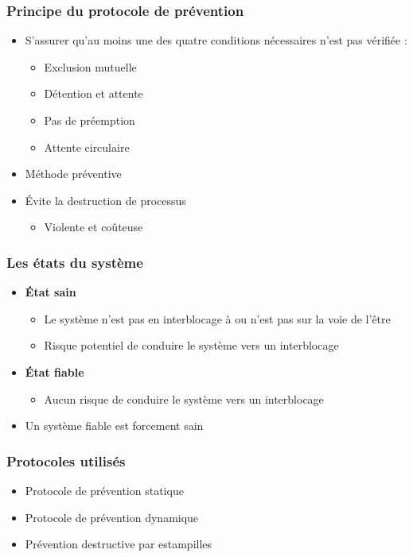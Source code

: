 \begin{frame}
\frametitle{Principe du protocole de prévention}
\begin{itemize}
\item S’assurer qu’au moins une des quatre conditions nécessaires n’est pas vérifiée :
\begin{itemize}
\item Exclusion mutuelle
\item Détention et attente
\item Pas de préemption
\item Attente circulaire
\end{itemize}
\item Méthode préventive
\item Évite la destruction de processus
\begin{itemize}
\item Violente et coûteuse
\end{itemize}
\end{itemize}
\end{frame}

\begin{frame}
\frametitle{Les états du système}
\begin{itemize}
\item <1-> \textbf{État sain}
\begin{itemize}
\item Le système n'est pas en interblocage à ou n'est pas sur la voie de l'être
\item Risque potentiel de conduire le système vers un interblocage
\end{itemize}
\item <2-> \textbf{État fiable}
\begin{itemize}
\item Aucun risque de conduire le système vers un interblocage
\end{itemize}
\item <3-> Un système fiable est forcement sain
\end{itemize}
\end{frame}

\begin{frame}
\frametitle{Protocoles utilisés}
\begin{itemize}
\item Protocole de prévention statique
\item Protocole de prévention dynamique
\item Prévention destructive par estampilles
\end{itemize}
\end{frame}

